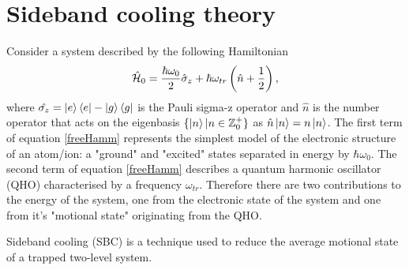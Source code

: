 \section{Sideband cooling theory}
Consider a system described by the following Hamiltonian
\begin{equation}\label{freeHamm}
	\hat{\mathcal{H}}_0 = \frac{\hbar \omega_0}{2} \hat{\sigma}_z + \hbar \omega_{tr} \left(\hat{n} + \frac{1}{2}\right),
\end{equation}
where $\hat{\sigma_z} = \ket{e}\bra{e}-\ket{g}\bra{g}$ is the Pauli sigma-z operator and $\hat{n}$ is the number operator that acts on the eigenbasis $\{\ket{n}| n \in \mathbb{Z}^+_0\}$ as $\hat{n}\ket{n}=n\ket{n}$. The first term of equation \eqref{freeHamm} represents the simplest model of the electronic structure of an atom/ion: a "ground" and "excited" states separated in energy by $\hbar \omega_0$. The second term of equation \eqref{freeHamm} describes a quantum harmonic oscillator (QHO) characterised by a frequency $\omega_{tr}$. Therefore there are two contributions to the energy of the system, one from the electronic state of the system and one from it's "motional state" originating from the QHO.

Sideband cooling (SBC) is a technique used to reduce the average motional state of a trapped two-level system. 